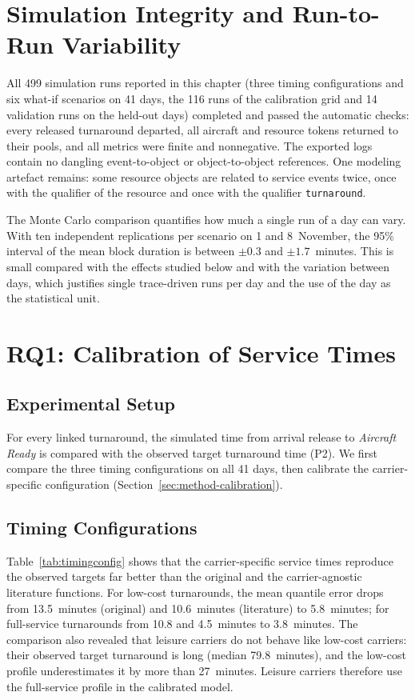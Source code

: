 \section{Simulation Integrity and Run-to-Run Variability}
\label{sec:eval-integrity}

All 499 simulation runs reported in this chapter (three timing configurations and six what-if scenarios on 41 days, the 116 runs of the calibration grid and 14 validation runs on the held-out days) completed and passed the automatic checks: every released turnaround departed, all aircraft and resource tokens returned to their pools, and all metrics were finite and nonnegative. The exported logs contain no dangling event-to-object or object-to-object references. One modeling artefact remains: some resource objects are related to service events twice, once with the qualifier of the resource and once with the qualifier \texttt{turnaround}.

The Monte Carlo comparison quantifies how much a single run of a day can vary. With ten independent replications per scenario on 1 and 8~November, the 95\% interval of the mean block duration is between $\pm0.3$ and $\pm1.7$~minutes. This is small compared with the effects studied below and with the variation between days, which justifies single trace-driven runs per day and the use of the day as the statistical unit.

\section{RQ1: Calibration of Service Times}
\label{sec:eval-rq1}
\label{sec:eval-validity}

\subsection{Experimental Setup}
For every linked turnaround, the simulated time from arrival release to \emph{Aircraft Ready} is compared with the observed target turnaround time (P2). We first compare the three timing configurations on all 41 days, then calibrate the carrier-specific configuration (Section~\ref{sec:method-calibration}).

\subsection{Timing Configurations}
Table~\ref{tab:timingconfig} shows that the carrier-specific service times reproduce the observed targets far better than the original and the carrier-agnostic literature functions. For low-cost turnarounds, the mean quantile error drops from 13.5~minutes (original) and 10.6~minutes (literature) to 5.8~minutes; for full-service turnarounds from 10.8 and 4.5~minutes to 3.8~minutes. The comparison also revealed that leisure carriers do not behave like low-cost carriers: their observed target turnaround is long (median 79.8~minutes), and the low-cost profile underestimates it by more than 27~minutes. Leisure carriers therefore use the full-service profile in the calibrated model.

